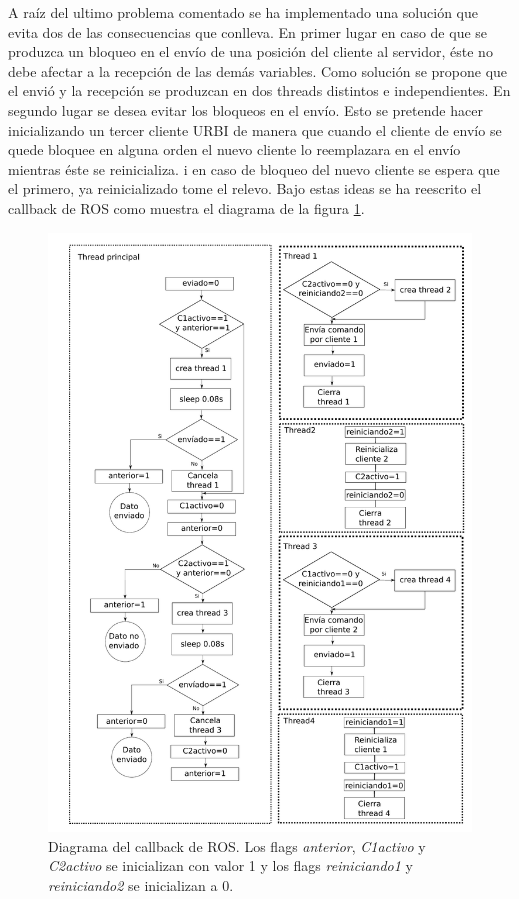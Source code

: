 \documentclass[12pt,a4paper,final,twoside]{book}
\begin{document}
A raíz del ultimo problema comentado se ha implementado una solución que evita dos de las consecuencias que conlleva.
En primer lugar en caso de que se produzca un bloqueo en el envío de una posición del cliente al servidor, éste no debe afectar a la recepción de las demás variables. Como solución se propone que el envió y la recepción se produzcan en dos threads distintos e independientes. 
En segundo lugar se desea evitar los bloqueos en el envío. Esto se pretende hacer inicializando un tercer cliente URBI de manera que cuando el cliente de envío se quede bloquee en alguna orden el nuevo cliente lo reemplazara en el envío mientras éste se reinicializa. i en caso de bloqueo del nuevo cliente se espera que el primero, ya reinicializado tome el relevo.
Bajo estas ideas se ha reescrito el callback de ROS como muestra el diagrama de la figura \ref{fig:Call}.
\newpage
\begin{figure}[H]
	\centering
    \includegraphics[scale=0.7]{images/esquemaCall.pdf}
	 \caption{Diagrama del callback de ROS. Los flags \textit{anterior}, \textit{C1activo} y \textit{C2activo}  se inicializan con valor 1 y los flags \textit{reiniciando1} y \textit{reiniciando2} se inicializan a 0.}
  \label{fig:Call}
\end{figure}
\end{document}

